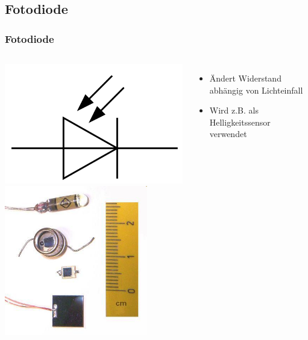 \subsection*{Fotodiode}
\begin{frame}
  \frametitle{Fotodiode}
  \begin{columns}[c]
    \begin{center}
      \includegraphics[width=1\textwidth,height=.3\textheight,keepaspectratio]{a05/Symbol_Photodiode.png}\\
      \includegraphics[width=0.8\textwidth,height=.55\textheight,keepaspectratio]{a05/Fotodio.jpg}
      \tiny \hyperlink{refs}{\cite{wm}}
    \end{center}
    \begin{itemize}
      \item Ändert Widerstand abhängig von Lichteinfall
      \item Wird z.B. als Helligkeitssensor verwendet
    \end{itemize}
  \end{columns}
\end{frame}

